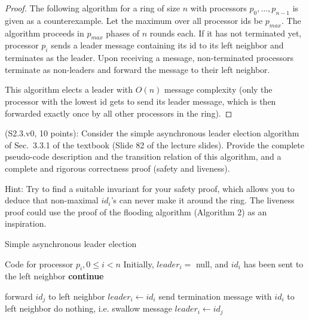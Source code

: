 \begin{proof}
The following algorithm for a ring of size $n$ with processors $p_0, \ldots, p_{n-1}$
is given as a counterexample. Let the maximum over all processor ids be $p_{max}$.
The algorithm proceeds in $p_{max}$ phases of $n$ rounds each.
If it has not terminated yet, processor $p_i$ sends a leader message containing its id
to its left neighbor and terminates as the leader. Upon receiving a message, non-terminated processors
terminate as non-leaders and forward the message to their left neighbor.

This algorithm elects a leader with $O(n)$ message complexity (only the processor with the lowest
id gets to send its leader message, which is then forwarded exactly once by all other processors in
the ring).
\end{proof}


\begin{Exc}{(S2.3.v0, 10 points):}
Consider the simple asynchronous leader election algorithm of Sec.~3.3.1 of
the textbook (Slide 82 of the lecture slides). Provide the complete
pseudo-code description and the transition relation of this algorithm,
and a complete and rigorous correctness proof (safety and liveness).

\normalfont
Hint: Try to find a suitable invariant for your safety proof, which allows
you to deduce that non-maximal $id_i$'s can never make it around the ring.
The liveness proof could use the proof of the flooding algorithm
(Algorithm 2) as an inspiration.
\end{Exc}

\begin{algorithm}
\caption{Simple asynchronous leader election} \label{alg:ale}
\begin{algorithmic}[1]
\Statex Code for processor $p_i, 0 \leq i < n$
\Statex Initially, $leader_i = $ null, and $id_i$ has been sent to the left neighbor
        \State \textbf{continue}
    \EndIf

        \State forward $id_j$ to left neighbor
        \State $leader_i \gets id_i$
        \State send termination message with $id_i$ to left neighbor
        \State do nothing, i.e. swallow message
        \State $leader_i \gets id_j$
    \EndIf
\EndFor
\end{algorithmic}
\end{algorithm}

